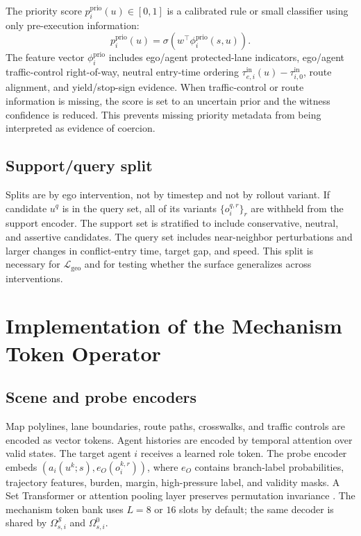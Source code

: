 \documentclass[10pt]{article}
\newcommand{\cS}{\mathcal{S}}
\begin{document}
The priority score \(p_i^{\mathrm{prio}}(u)\in[0,1]\) is a calibrated rule or small classifier using only pre-execution information:
\[
p_i^{\mathrm{prio}}(u)
=
\sigma\!\left(w^\top\phi_i^{\mathrm{prio}}(s,u)\right).
\]
The feature vector \(\phi_i^{\mathrm{prio}}\) includes ego/agent protected-lane indicators, ego/agent traffic-control right-of-way, neutral entry-time ordering \(\tau_{e,i}^{\mathrm{in}}(u)-\tau_{i,0}^{\mathrm{in}}\), route alignment, and yield/stop-sign evidence. When traffic-control or route information is missing, the score is set to an uncertain prior and the witness confidence is reduced. This prevents missing priority metadata from being interpreted as evidence of coercion.

\subsection{Support/query split}
\label{app:support_query_split}

Splits are by ego intervention, not by timestep and not by rollout variant. If candidate \(u^q\) is in the query set, all of its variants \(\{o_i^{q,r}\}_{r}\) are withheld from the support encoder. The support set is stratified to include conservative, neutral, and assertive candidates. The query set includes near-neighbor perturbations and larger changes in conflict-entry time, target gap, and speed. This split is necessary for \(\mathcal L_{\mathrm{geo}}\) and for testing whether the surface generalizes across interventions.

\section{Implementation of the Mechanism Token Operator}
\label{app:network_training}

\subsection{Scene and probe encoders}

Map polylines, lane boundaries, route paths, crosswalks, and traffic controls are encoded as vector tokens. Agent histories are encoded by temporal attention over valid states. The target agent \(i\) receives a learned role token. The probe encoder embeds \((a_i(u^k;s),e_O(o_i^{k,r}))\), where \(e_O\) contains branch-label probabilities, trajectory features, burden, margin, high-pressure label, and validity masks. A Set Transformer or attention pooling layer preserves permutation invariance \parencite{lee2019set}. The mechanism token bank uses \(L=8\) or \(16\) slots by default; the same decoder is shared by \(\Omega_{s,i}^{\cS}\) and \(\Omega_{s,i}^{0}\).
\end{document}

